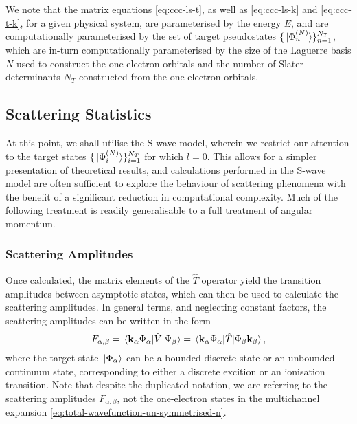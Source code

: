 \documentclass[draft]{article}
\begin{document}
We note that the matrix equations \autoref{eq:ccc-ls-t}, as well as
\autoref{eq:ccc-ls-k} and \autoref{eq:ccc-t-k}, for a given physical system, are
parameterised by the energy $E$, and are computationally parameterised by the
set of target pseudostates
$\lbrace\ket*{\Phi_{n}^{(N)}}\rbrace_{n = 1}^{N_{T}}$, which are in-turn
computationally parameterised by the size of the Laguerre basis $N$ used to
construct the one-electron orbitals and the number of Slater determinants $N_{T}$
constructed from the one-electron orbitals.


\subsection{Scattering Statistics}
\label{sec:scattering-statistics}

At this point, we shall utilise the S-wave model, wherein we restrict our
attention to the target states
$\lbrace\ket*{\Phi_{i}^{(N)}}\rbrace_{i = 1}^{N_{T}}$ for which $l = 0$.
This allows for a simpler presentation of theoretical results, and calculations
performed in the S-wave model are often sufficient to explore the behaviour of
scattering phenomena with the benefit of a significant reduction in
computational complexity.
Much of the following treatment is readily generalisable to a full treatment of
angular momentum.

\subsubsection{Scattering Amplitudes}
\label{sec:scattering-amplitudes}

Once calculated, the matrix elements of the $\hat{T}$ operator yield the
transition amplitudes between asymptotic states, which can then be used to
calculate the scattering amplitudes.
In general terms, and neglecting constant factors, the scattering amplitudes can
be written in the form
\begin{equation}
  \label{eq:scattering-amplitude}
  F_{\alpha, \beta}
  =
  \mel*
  {\vb{k}_{\alpha} \Phi_{\alpha}}
  {\hat{V}}
  {\Psi_{\beta}}
  =
  \mel*
  {\vb{k}_{\alpha} \Phi_{\alpha}}
  {\hat{T}}
  {\Phi_{\beta} \vb{k}_{\beta}}
  ,
\end{equation}
where the target state $\ket*{\Phi_{\alpha}}$ can be a bounded discrete
state or an unbounded continuum state, corresponding to either a discrete
excition or an ionisation transition.
Note that despite the duplicated notation, we are referring to the scattering
amplitudes $F_{\alpha, \beta}$, not the one-electron states in the multichannel
expansion \autoref{eq:total-wavefunction-un-symmetrised-n}.
\end{document}
